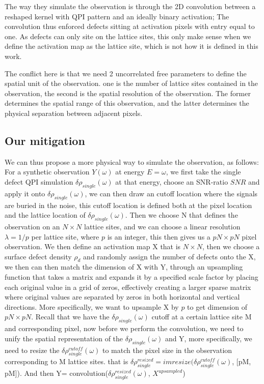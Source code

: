 The way they simulate the observation is through the 2D convolution between a reshaped kernel with QPI pattern and an ideally binary activation; The convolution thus enforced defects sitting at activation pixels with entry equal to one. As defects can only site on the lattice sites, this only make sense when we define the activation map as the lattice site, which is not how it is defined in this work. 

The conflict here is that we need 2 uncorrelated free parameters to define the spatial unit of the observation. one is the number of lattice sites contained in the observation, the second is the spatial resolution of the observation. The former determines the spatial range of this observation, and the latter determines the physical separation between adjacent pixels. 
 
 
\subsection{Our mitigation}

We can thus propose a more physical way to simulate the observation, as follows: 
For a synthetic observation $Y(\omega)$ at energy $E=\omega$, we first take the single defect QPI simulation $\delta\rho_{single} (\omega)$ at that energy, choose an SNR-ratio $SNR$ and apply it onto $\delta\rho_{single} (\omega)$, we can then draw an cutoff location where the signals are buried in the noise, this cutoff location is defined both at the pixel location and the lattice location of $\delta\rho_{single} (\omega)$. Then we choose N that defines the observation on an $N\times N$ lattice sites, and we can choose a linear resolution $\lambda = 1/p$ per lattice site, where $p$ is an integer, this then gives us a $pN \times pN$ pixel observation.
We then define an activation map X that is $N\times N$, then we choose a surface defect density $\rho_d$ and randomly assign the number of defects onto the X, we then can then match the dimension of X with Y, through an upsampling function that takes a matrix and expands it by a specified scale factor by placing each original value in a grid of zeros, effectively creating a larger sparse matrix where original values are separated by zeros in both horizontal and vertical directions. More specifically, we want to upsample X by $p$ to get dimension of $pN \times pN$. 
Recall that we have the $\delta\rho_{single} (\omega)$ cutoff at a certain lattice site M and corresponding pixel, now before we perform the convolution, we need to unify the spatial representation of the $\delta\rho_{single} (\omega)$ and Y, more specifically, we need to resize the $\delta\rho^{cutoff}_{single} (\omega)$ to match the pixel size in the observation corresponding to M lattice sites. that is $\delta\rho^{resized}_{single}= imresize(\delta\rho^{cutoff}_{single} (\omega)$, [pM, pM]). And then Y= convolution($\delta\rho^{resized}_{single} (\omega)$, $X^{upsampled}$)

